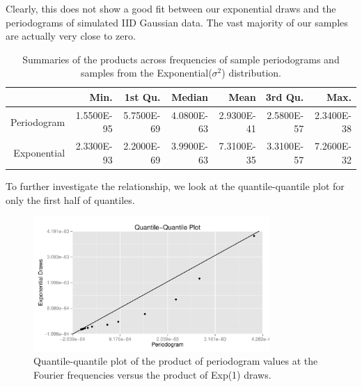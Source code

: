 \documentclass{article}\usepackage[]{graphicx}\usepackage[]{color}
\newenvironment{knitrout}{}{} %
\theoremstyle{plain}
\begin{document}
Clearly, this does not show a good fit between our exponential draws and the periodograms of simulated IID Gaussian data. The vast majority of our samples are actually very close to zero.
\begin{table}[H]
\centering
\begin{tabular}{rrrrrrr}
  \hline
 & Min. & 1st Qu. & Median & Mean & 3rd Qu. & Max. \\ 
  \hline
Periodogram & 1.5500E-95 & 5.7500E-69 & 4.0800E-63 & 2.9300E-41 & 2.5800E-57 & 2.3400E-38 \\ 
  Exponential & 2.3300E-93 & 2.2000E-69 & 3.9900E-63 & 7.3100E-35 & 3.3100E-57 & 7.2600E-32 \\ 
   \hline
\end{tabular}
\caption{Summaries of the products across frequencies of sample periodograms and samples from the Exponential($\sigma^2$) distribution.} 
\end{table}


To further investigate the relationship, we look at the quantile-quantile plot for only the first half of quantiles.
\begin{knitrout}
\color{fgcolor}\begin{figure}[H]


{\centering \includegraphics[width=0.8\textwidth]{figure/qqplot2} 

}

\caption[Quantile-quantile plot of the product of periodogram values at the Fourier frequencies versus the product of Exp(1) draws]{Quantile-quantile plot of the product of periodogram values at the Fourier frequencies versus the product of Exp(1) draws.\label{fig:qqplot2}}
\end{figure}


\end{knitrout}
\end{document}
